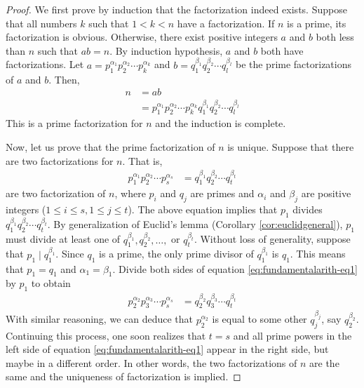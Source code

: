 \begin{proof}
	We first prove by induction that the factorization indeed exists. Suppose that all numbers $k$ such that $1<k<n$ have a factorization. If $n$ is a prime, its factorization is obvious. Otherwise, there exist positive integers $a$ and $b$ both less than $n$ such that $ab=n$. By induction hypothesis, $a$ and $b$ both have factorizations. Let $a=p_1^{\alpha_1}p_2^{\alpha_2}\cdots p_k^{\alpha_k}$ and $b=q_1^{\beta_1}q_2^{\beta_2}\cdots q_l^{\beta_l}$ be the prime factorizations of $a$ and $b$. Then,
	\begin{align*}
		n
			& = ab\\
			& = p_1^{\alpha_1}p_2^{\alpha_2}\cdots p_k^{\alpha_k}q_1^{\beta_1}q_2^{\beta_2}\cdots q_l^{\beta_l}
	\end{align*}
	This is a prime factorization for $n$ and the induction is complete.

	Now, let us prove that the prime factorization of $n$ is unique. Suppose that there are two factorizations for $n$. That is,
	\begin{align}
		p_1^{\alpha_1}p_2^{\alpha_2}\cdots p_s^{\alpha_s}
			& =q_1^{\beta_1}q_2^{\beta_2}\cdots q_t^{\beta_t} \label{eq:fundamentalarith-eq1}
	\end{align}
	are two factorization of $n$, where $p_i$ and $q_j$ are primes and $\alpha_i$ and $\beta_j$ are positive integers ($1 \leq i \leq s, 1 \leq j \leq t$). The above equation implies that $p_1$ divides $q_1^{\beta_1}q_2^{\beta_2}\cdots q_t^{\beta_t}$. By generalization of Euclid's lemma (Corollary \eqref{cor:euclidgeneral}), $p_1$ must divide at least one of $q_1^{\beta_1},q_2^{\beta_2},\dots,$ or $q_t^{\beta_t}$. Without loss of generality, suppose that $p_1\mid q_1^{\beta_1}$. Since $q_1$ is a prime, the only prime divisor of $q_1^{\beta_1}$ is $q_1$. This means that $p_1=q_1$ and $\alpha_1=\beta_1$. Divide both sides of equation \eqref{eq:fundamentalarith-eq1} by $p_1$ to obtain
	\begin{align*}
		p_2^{\alpha_2}p_3^{\alpha_3}\cdots p_s^{\alpha_s}
			& =q_2^{\beta_2}q_3^{\beta_3}\cdots q_t^{\beta_t}
	\end{align*}
	With similar reasoning, we can deduce that $p_2^{\alpha_2}$ is equal to some other $q_j^{\beta_j}$, say $q_{2}^{\beta_2}$. Continuing this process, one soon realizes that $t=s$ and all prime powers in the left side of equation \eqref{eq:fundamentalarith-eq1} appear in the right side, but maybe in a different order. In other words, the two factorizations of $n$ are the same and the uniqueness of factorization is implied.
\end{proof}

